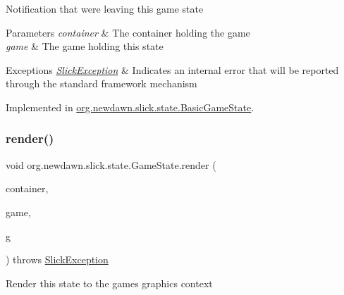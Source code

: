 Notification that we\textquotesingle{}re leaving this game state


\begin{DoxyParams}{Parameters}
{\em container} & The container holding the game \\
\hline
{\em game} & The game holding this state \\
\hline
\end{DoxyParams}

\begin{DoxyExceptions}{Exceptions}
{\em \mbox{\hyperlink{classorg_1_1newdawn_1_1slick_1_1_slick_exception}{Slick\+Exception}}} & Indicates an internal error that will be reported through the standard framework mechanism \\
\hline
\end{DoxyExceptions}


Implemented in \mbox{\hyperlink{classorg_1_1newdawn_1_1slick_1_1state_1_1_basic_game_state_ae9a3aab0c109cfe3f3aa56d1d6b4f33e}{org.\+newdawn.\+slick.\+state.\+Basic\+Game\+State}}.

\mbox{\label{interfaceorg_1_1newdawn_1_1slick_1_1state_1_1_game_state_a065352d2725274c5244cd022f226eb17}} 
\subsubsection{\texorpdfstring{render()}{render()}}
{\footnotesize\ttfamily void org.\+newdawn.\+slick.\+state.\+Game\+State.\+render (\begin{DoxyParamCaption}\item[{\mbox{\hyperlink{classorg_1_1newdawn_1_1slick_1_1_game_container}{Game\+Container}}}]{container,  }\item[{\mbox{\hyperlink{classorg_1_1newdawn_1_1slick_1_1state_1_1_state_based_game}{State\+Based\+Game}}}]{game,  }\item[{\mbox{\hyperlink{classorg_1_1newdawn_1_1slick_1_1_graphics}{Graphics}}}]{g }\end{DoxyParamCaption}) throws \mbox{\hyperlink{classorg_1_1newdawn_1_1slick_1_1_slick_exception}{Slick\+Exception}}}

Render this state to the game\textquotesingle{}s graphics context


